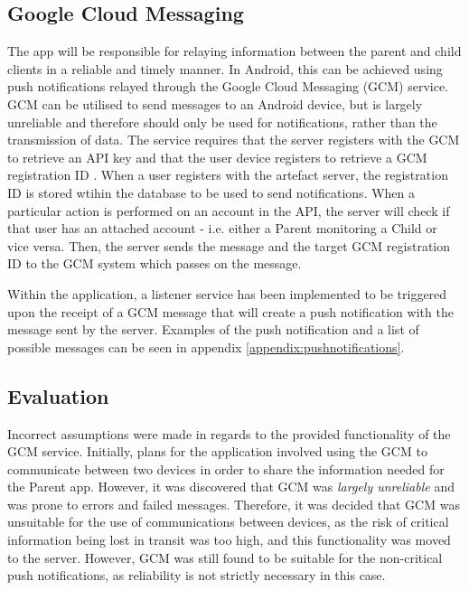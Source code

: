 
\subsection{Google Cloud Messaging}
The app will be responsible for relaying information between the parent and child clients in a reliable and timely manner.
In Android, this can be achieved using push notifications relayed through the Google Cloud Messaging (GCM) service.
GCM can be utilised to send messages to an Android device, but is largely unreliable \citep{gcmreliability} and therefore should only be used for notifications, rather than the transmission of data.
The service requires that the server registers with the GCM to retrieve an API key and that the user device registers to retrieve a GCM registration ID \citep{gcm}. 
When a user registers with the artefact server, the registration ID is stored wtihin the database to be used to send notifications.
When a particular action is performed on an account in the API, the server will check if that user has an attached account - i.e. either a Parent monitoring a Child or vice versa.
Then, the server sends the message and the target GCM registration ID to the GCM system which passes on the message.

Within the application, a listener service has been implemented to be triggered upon the receipt of a GCM message that will create a push notification with the message sent by the server.
Examples of the push notification and a list of possible messages can be seen in appendix \ref{appendix:pushnotifications}.

\subsection{Evaluation}
Incorrect assumptions were made in regards to the provided functionality of the GCM service. 
Initially, plans for the application involved using the GCM to communicate between two devices in order to share the information needed for the Parent app.
However, it was discovered that GCM was \emph{largely unreliable} \citep{gcmreliability} and was prone to errors and failed messages.
Therefore, it was decided that GCM was unsuitable for the use of communications between devices, as the risk of critical information being lost in transit was too high, and this functionality was moved to the server.
However, GCM was still found to be suitable for the non-critical push notifications, as reliability is not strictly necessary in this case. 

